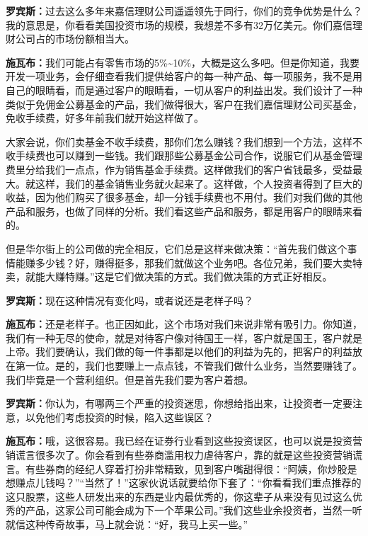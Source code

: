 \begin{BookQuote}
\textbf{罗宾斯：}过去这么多年来嘉信理财公司遥遥领先于同行，你们的竞争优势是什么？我的意思是，你看看美国投资市场的规模，我想差不多有32万亿美元。你们嘉信理财公司占的市场份额相当大。
\end{BookQuote}

\begin{BookQuote}
\textbf{施瓦布：}我们可能占有零售市场的5\%\textasciitilde{}10\%，大概是这么多吧。但是你知道，我要开发一项业务，会仔细查看我们提供给客户的每一种产品、每一项服务，我不是用自己的眼睛看，而是通过客户的眼睛看，一切从客户的利益出发。我们设计了一种类似于免佣金公募基金的产品，我们做得很大，客户在我们嘉信理财公司买基金，免收手续费，好多年前我们就开始这样做了。
\end{BookQuote}

大家会说，你们卖基金不收手续费，那你们怎么赚钱？我们想到一个方法，这样不收手续费也可以赚到一些钱。我们跟那些公募基金公司合作，说服它们从基金管理费里分给我们一点点，作为销售基金手续费。这样做我们的客户省钱最多，受益最大。就这样，我们的基金销售业务就火起来了。这样做，个人投资者得到了巨大的收益，因为他们购买了很多基金，却一分钱手续费也不用付。我们对我们做的其他产品和服务，也做了同样的分析。我们看这些产品和服务，都是用客户的眼睛来看的。

但是华尔街上的公司做的完全相反，它们总是这样来做决策：“首先我们做这个事情能赚多少钱？好，赚得挺多，那我们就做这个业务吧。各位兄弟，我们要大卖特卖，就能大赚特赚。”这是它们做决策的方式。我们做决策的方式正好相反。

\begin{BookQuote}
\textbf{罗宾斯：}现在这种情况有变化吗，或者说还是老样子吗？
\end{BookQuote}

\begin{BookQuote}
\textbf{施瓦布：}还是老样子。也正因如此，这个市场对我们来说非常有吸引力。你知道，我们有一种无尽的使命，就是对待客户像对待国王一样，客户就是国王，客户就是上帝。我们要确认，我们做的每一件事都是以他们的利益为先的，把客户的利益放在第一位。是的，我们也要赚上一点点钱，不管我们做什么业务，当然要赚钱了。我们毕竟是一个营利组织。但是首先我们要为客户着想。
\end{BookQuote}

\begin{BookQuote}
\textbf{罗宾斯：}你认为，有哪两三个严重的投资迷思，你想给指出来，让投资者一定要注意，以免他们考虑投资的时候，陷入这些误区？
\end{BookQuote}

\begin{BookQuote}
\textbf{施瓦布：}哦，这很容易。我已经在证券行业看到这些投资误区，也可以说是投资营销谎言很多次了。你会看到有些券商滥用权力虐待客户，靠的就是这些投资营销谎言。有些券商的经纪人穿着打扮非常精致，见到客户嘴甜得很：“阿姨，你炒股是想赚点儿钱吗？”“当然了！”这家伙说话就要给你下套了：“你看看我们重点推荐的这只股票，这些人研发出来的东西是业内最优秀的，你这辈子从来没有见过这么优秀的产品，这家公司可能会成为下一个苹果公司。”我们这些业余投资者，当然一听就信这种传奇故事，马上就会说：“好，我马上买一些。”
\end{BookQuote}

